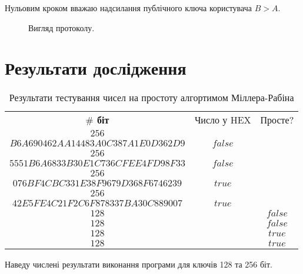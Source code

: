 \begin{remark}
	 Нульовим кроком вважаю надсилання публічного ключа користувача $B>A$.
\end{remark}


\begin{figure}[h]
			\caption{Вигляд протоколу.}
			\label{fig:protocole}
		\end{figure}

\newpage


\section{Результати дослідження}

\begin{table}
\begin{tabularx}{\textwidth}{c|c|c}

\textbf{$\#$ біт} & Число у HEX & Просте?\\
	$256$ & \substack{ $0xDA44D604C658EAA955379B1B7B94F321$\\ $B6A690462AA14483A0C387A1E0D362D9$}& $false$
	\\[2em] 
	$256$ & \substack{ $0xDBF6CB5A81388144448A6387CC960642$\\ $5551B6A6833B30E1C736CFEE4FD98F33$}& $false$
	\\[2em] 
	$256$ & \substack{ $0x3393DFF87DC8C9FAA2C8C31597BB3C66$\\ $076BF4CBC331E38F9679D368F6746239$}& $true$
	\\[2em] 
	$256$ & \substack{ $0x17CCA6C243E91E490147765C97BD3F7D$\\ $42E5FE4C21F2C6F878337BA30C889007$}& $true$
	\\[2em] 
	$128$ & \substack{ $0x4203E2FF7902D5725FE064183FC35681$ } & $false$
	\\[2em] 
	$128$ & \substack{ $0xD705D142F93F21868CBBA75E5B06388$ }& $false$
	\\[2em]
	$128$ & \substack{ $0xE3856FDE94235F7457F7B023BD918D6D$ }& $true$
	\\[2em] 
	$128$ & \substack{ $0xFB23844228242601CEE61AEE41E66525$ }& $true$
	\\[2em] 
	\end{tabularx}
	      \caption{Результати тестування чисел на простоту алгортимом Міллера-Рабіна}
\end{table}


Наведу числені результати виконання програми для ключів 128 та 256 біт.

